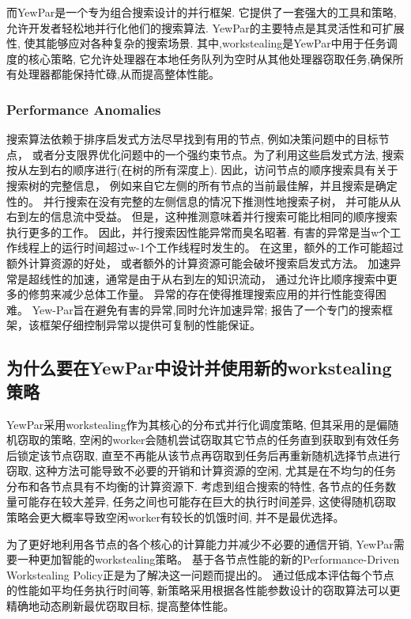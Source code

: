 \documentclass{mproj}
\begin{document}
而YewPar是一个专为组合搜索设计的并行框架.
它提供了一套强大的工具和策略,允许开发者轻松地并行化他们的搜索算法.
YewPar的主要特点是其灵活性和可扩展性,
使其能够应对各种复杂的搜索场景.
其中,workstealing是YewPar中用于任务调度的核心策略,
它允许处理器在本地任务队列为空时从其他处理器窃取任务,确保所有处理器都能保持忙碌,从而提高整体性能。

\subsubsection{Performance Anomalies}
\label{sec:performance_anomalies}
搜索算法依赖于排序启发式方法尽早找到有用的节点,
例如决策问题中的目标节点，
或者分支限界优化问题中的一个强约束节点。为了利用这些启发式方法,
搜索按从左到右的顺序进行(在树的所有深度上).
因此，访问节点的顺序搜索具有关于搜索树的完整信息，
例如来自它左侧的所有节点的当前最佳解，并且搜索是确定性的。
并行搜索在没有完整的左侧信息的情况下推测性地搜索子树，
并可能从从右到左的信息流中受益。
但是，这种推测意味着并行搜索可能比相同的顺序搜索执行更多的工作。
因此，并行搜索因性能异常而臭名昭著\cite{10.1007/3-540-60321-2_29}.
有害的异常是当w个工作线程上的运行时间超过w-1个工作线程时发生的。
在这里，额外的工作可能超过额外计算资源的好处，
或者额外的计算资源可能会破坏搜索启发式方法。
加速异常是超线性的加速，通常是由于从右到左的知识流动，
通过允许比顺序搜索中更多的修剪来减少总体工作量。
异常的存在使得推理搜索应用的并行性能变得困难。
Yew-Par旨在避免有害的异常,同时允许加速异常;
\cite{ARCHIBALD201892}报告了一个专门的搜索框架，该框架仔细控制异常以提供可复制的性能保证。

\subsection{为什么要在YewPar中设计并使用新的workstealing策略}

YewPar采用workstealing作为其核心的分布式并行化调度策略,
但其采用的是偏随机窃取的策略\cite{archibald2019yewpar},
空闲的worker会随机尝试窃取其它节点的任务直到获取到有效任务后锁定该节点窃取,
直至不再能从该节点再窃取到任务后再重新随机选择节点进行窃取,
这种方法可能导致不必要的开销和计算资源的空闲,
尤其是在不均匀的任务分布和各节点具有不均衡的计算资源下.
考虑到组合搜索的特性,
各节点的任务数量可能存在较大差异,
任务之间也可能存在巨大的执行时间差异,
这使得随机窃取策略会更大概率导致空闲worker有较长的饥饿时间,
并不是最优选择。

为了更好地利用各节点的各个核心的计算能力并减少不必要的通信开销,
YewPar需要一种更加智能的workstealing策略。
基于各节点性能的新的Performance-Driven Workstealing Policy正是为了解决这一问题而提出的。
通过低成本评估每个节点的性能如平均任务执行时间等,
新策略采用根据各性能参数设计的窃取算法可以更精确地动态刷新最优窃取目标,
提高整体性能。
\end{document}
